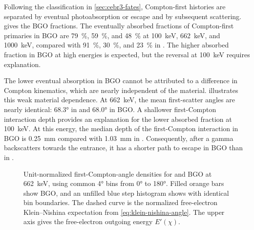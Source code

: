 Following the classification in \cref{sec:cebr3-fates}, Compton-first histories are separated by eventual photoabsorption or escape and by subsequent scattering.  gives the BGO fractions. The eventually absorbed fractions of Compton-first primaries in BGO are \qty{79}{\percent}, \qty{59}{\percent}, and \qty{48}{\percent} at \qty{100}{\kilo\electronvolt}, \qty{662}{\kilo\electronvolt}, and \qty{1000}{\kilo\electronvolt}, compared with \qty{91}{\percent}, \qty{30}{\percent}, and \qty{23}{\percent} in . The higher absorbed fraction in BGO at high energies is expected, but the reversal at \qty{100}{\kilo\electronvolt} requires explanation.

The lower eventual absorption in BGO cannot be attributed to a difference in Compton kinematics, which are nearly independent of the material.  illustrates this weak material dependence. At \qty{662}{\kilo\electronvolt}, the mean first-scatter angles are nearly identical: \ang{68.3} in  and \ang{68.0} in BGO. A shallower first-Compton interaction depth provides an explanation for the lower absorbed fraction at \qty{100}{\kilo\electronvolt}. At this energy, the median depth of the first-Compton interaction in BGO is \qty{0.25}{\milli\metre} compared with \qty{1.03}{\milli\metre} in . Consequently, after a gamma backscatters towards the entrance, it has a shorter path to escape in BGO than in .

\begin{figure}[!htbp]
  \captionsetup{font=small}
  \centering
  \caption{Unit-normalized first-Compton-angle densities for  and BGO at \qty{662}{\kilo\electronvolt}, using common \ang{4} bins from \ang{0} to \ang{180}. Filled orange bars show BGO, and an unfilled blue step histogram shows  with identical bin boundaries. The dashed curve is the normalized free-electron Klein--Nishina expectation from \cref{eq:klein-nishina-angle}. The upper axis gives the free-electron outgoing energy $E'(\chi)$.}
  \label{fig:material-compton-angles}
\end{figure}

